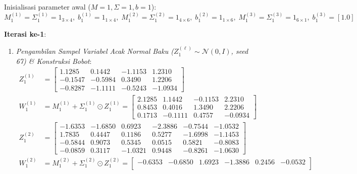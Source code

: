 \documentclass[11pt,a4paper]{article}
\def\mathbf#1{#1}%
\theoremstyle{plain}
\theoremstyle{definition}
\theoremstyle{remark}
\begin{document}
\noindent Inisialisasi parameter awal ($M = \mathbf{1}, \Sigma = \mathbf{1}, \mathbf{b} = \mathbf{1}$):
\begin{equation}
    M^{(1)}_1 = \Sigma^{(1)}_1 = \mathbf{1}_{3 \times 4}, \; \mathbf{b}^{(1)}_1 = \mathbf{1}_{1 \times 4}, \; M^{(2)}_1 = \Sigma^{(2)}_1 = \mathbf{1}_{4 \times 6}, \; \mathbf{b}^{(2)}_1 = \mathbf{1}_{1 \times 6}, \; M^{(3)}_1 = \Sigma^{(3)}_1 = \mathbf{1}_{6 \times 1}, \; \mathbf{b}^{(3)}_1 = [1.0]
\end{equation}

\noindent \textbf{Iterasi ke-1}:
\begin{enumerate}
    \item \textit{Pengambilan Sampel Variabel Acak Normal Baku ($Z^{(\ell)}_1 \sim \mathcal{N}(0, I)$, seed 67) \& Konstruksi Bobot}:
    \begin{align}
        Z^{(1)}_1 &= \begin{bmatrix}
             1.1285 &  0.1442 & -1.1153 &  1.2310 \\
            -0.1547 & -0.5984 &  0.3490 &  1.2206 \\
            -0.8287 & -1.1111 & -0.5243 & -1.0934
        \end{bmatrix} \\[0.2em]
        W^{(1)}_1 &= M^{(1)}_1 + \Sigma^{(1)}_1 \odot Z^{(1)}_1 = \begin{bmatrix}
            2.1285 &  1.1442 & -0.1153 &  2.2310 \\
            0.8453 &  0.4016 &  1.3490 &  2.2206 \\
            0.1713 & -0.1111 &  0.4757 & -0.0934
        \end{bmatrix} \\[0.2em]
        Z^{(2)}_1 &= \begin{bmatrix}
            -1.6353 & -1.6850 &  0.6923 & -2.3886 & -0.7544 & -1.0532 \\
             1.7835 &  0.4447 &  0.1186 &  0.5277 & -1.6998 & -1.1453 \\
            -0.5844 &  0.9073 &  0.5345 &  0.0515 &  0.5821 & -0.8083 \\
            -0.0859 &  0.3117 & -1.0321 &  0.9448 & -0.8261 & -1.0630
        \end{bmatrix} \\[0.2em]
        W^{(2)}_1 &= M^{(2)}_1 + \Sigma^{(2)}_1 \odot Z^{(2)}_1 = \begin{bmatrix}
            -0.6353 & -0.6850 &  1.6923 & -1.3886 &  0.2456 & -0.0532 \\

\end{bmatrix}
\end{align}
\end{enumerate}
\end{document}
